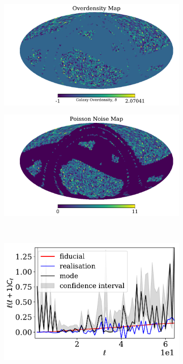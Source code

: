 \begin{figure}
\begin{subfigure}[b]{.5\textwidth}
 \includegraphics[scale=0.35]{BPL-FIGS/Euclid-Overdensity-N32.pdf}
  \caption{}
  \label{fig:BPL:LN-LowSN-overd}
\end{subfigure}
\begin{subfigure}[b]{.5\textwidth}
 \includegraphics[scale=0.35]{BPL-FIGS/Euclid-NoiseMap-N32.pdf}
  \caption{}
  \label{fig:BPL:LN-LowSN-noise}
\end{subfigure}\\
\begin{subfigure}{.5\textwidth}
  \centering
  \includegraphics[scale=0.50]{BPL-FIGS/Euclid-Foot-LN-PoiNoi-N32_HPDCls.pdf}

\end{subfigure}
\end{figure}
